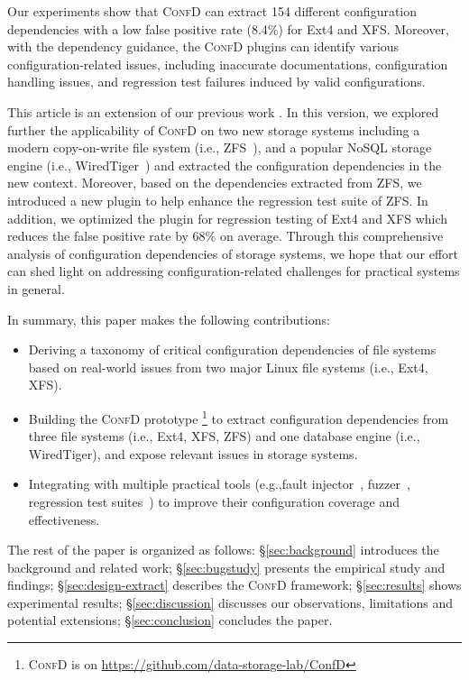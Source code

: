  Our experiments show that
\textsc{ConfD}  can extract 154 different configuration dependencies 
with a low false positive rate (8.4\%) for  Ext4 and XFS. 
Moreover, with the dependency guidance, 
the \textsc{ConfD} plugins can  
identify various configuration-related issues, including inaccurate documentations, configuration handling issues, and regression test failures induced by valid configurations.

{This article is an extension of our previous work \cite{mahmud2023confd}. In this version, we explored further the applicability of \textsc{ConfD} on two new storage systems including a modern copy-on-write file system (i.e., ZFS~\cite{zfs}), and a popular NoSQL storage engine (i.e.,  WiredTiger~\cite{wt}) and extracted the configuration dependencies in the new context. Moreover, based on the dependencies extracted from ZFS, we introduced a new plugin to help enhance the regression test suite of ZFS.
In addition, we  optimized the plugin for regression testing of Ext4 and XFS  which reduces the false positive rate  by 68\% on average. 
Through this comprehensive analysis of configuration dependencies of storage systems, 
we hope that our effort can shed light on addressing configuration-related challenges for practical systems in general. 

In summary, this paper makes the following contributions:
\begin{itemize}
    \item Deriving a taxonomy of critical  configuration dependencies of file systems based on  real-world  issues from two major Linux file systems (i.e., Ext4, XFS).
    \item Building the \textsc{ConfD} prototype \footnote{\textsc{ConfD} is on \url{https://github.com/data-storage-lab/ConfD}}
    to  extract configuration dependencies from three file systems (i.e., Ext4, XFS, ZFS) and one database engine (i.e., WiredTiger), and expose relevant issues in storage systems. 
    \item Integrating  with multiple practical tools (e.g.,fault injector~\cite{OmFAST18}, fuzzer~\cite{hydra-2019},  regression test suites~\cite{xfstest,e2fsprogs-test}) to improve their  configuration coverage and effectiveness.
\end{itemize}
}

The rest of the paper is organized as follows: \S\ref{sec:background} introduces the background and related work; \S\ref{sec:bugstudy} presents the empirical study and findings; \S\ref{sec:design-extract} describes the  \textsc{ConfD} framework;
\S\ref{sec:results} shows experimental results; \S\ref{sec:discussion} discusses our observations, limitations and potential extensions;   \S\ref{sec:conclusion} concludes the paper.